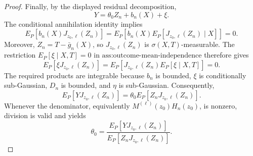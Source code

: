 \begin{proof}
Finally, by the displayed residual decomposition,
\[
 Y=\theta_0Z_n+b_n(X)+\xi.
\]
The conditional annihilation identity implies
\[
 E_P[b_n(X)J_{z_0,\ell}(Z_n)]
 =E_P\!\left[b_n(X)E_P[J_{z_0,\ell}(Z_n)\mid X]\right]=0.
\]
Moreover, \(Z_n=T-\bar g_n(X)\), so \(J_{z_0,\ell}(Z_n)\) is \(\sigma(X,T)\)-measurable.  The restriction \(E_P[\xi\mid X,T]=0\) in \(\text{ass:outcome-mean-independence}\) therefore gives
\[
 E_P[\xi J_{z_0,\ell}(Z_n)]
 =E_P\!\left[J_{z_0,\ell}(Z_n)E_P[\xi\mid X,T]\right]=0.
\]
The required products are integrable because \(b_n\) is bounded, \(\xi\) is conditionally sub-Gaussian, \(D_n\) is bounded, and \(\eta\) is sub-Gaussian.  Consequently,
\[
 E_P[YJ_{z_0,\ell}(Z_n)]
 =\theta_0E_P[Z_nJ_{z_0,\ell}(Z_n)].
\]
Whenever the denominator, equivalently \(M^{(\ell)}(z_0)H_n(z_0)\), is nonzero, division is valid and yields
\[
 \theta_0=
 \frac{E_P[YJ_{z_0,\ell}(Z_n)]}
      {E_P[Z_nJ_{z_0,\ell}(Z_n)]}.
\]
\end{proof}